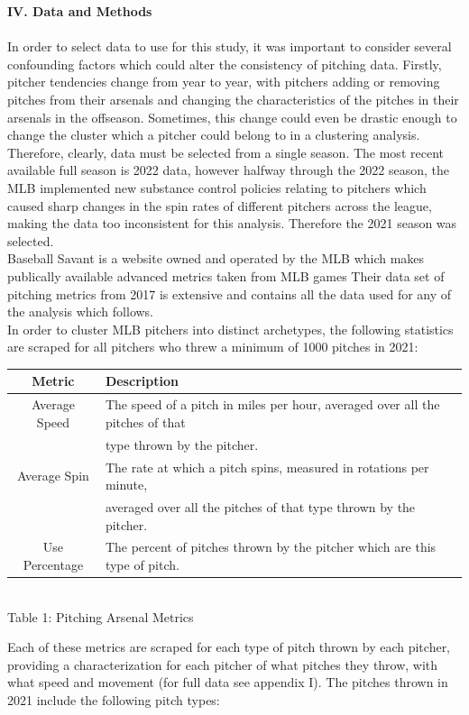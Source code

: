 \documentclass[12 pt]{article}
\begin{document}
\textbf{IV. Data and Methods} \\ \\
\indent In order to select data to use for this study, it was important to consider 
several confounding factors which could alter the consistency of pitching data. 
Firstly, pitcher tendencies change from year to year, with pitchers adding or removing 
pitches from their arsenals and changing the characteristics of the pitches in their 
arsenals in the offseason. Sometimes, this change could even be drastic enough to change the 
cluster which a pitcher could belong to in a clustering analysis. Therefore, clearly, 
data must be selected from a single season. The most recent available full season is 2022 data, however
halfway through the 2022 season, the MLB implemented new substance control policies 
relating to pitchers which caused sharp changes in the spin rates of different pitchers 
across the league, making the data too inconsistent for this analysis. Therefore the 2021 season was selected.
\\ \indent Baseball Savant is a website owned and operated by the MLB which makes 
publically available advanced metrics taken from MLB games Their data set of pitching 
metrics from 2017 is extensive and contains all the data used for any of the analysis which 
follows. 
\\ \indent In order to cluster MLB pitchers into distinct archetypes, the following 
statistics are scraped for all pitchers who threw a minimum of 1000 pitches in 2021:
\begin{center}
    \begin{tabular}{||c | l||} 
     \hline
     Metric & Description  \\ [0.5ex] 
     \hline
     Average Speed & The speed of a pitch in miles per hour, averaged over all the
     pitches of that \\ & type thrown by the pitcher. \\
     \hline
     Average Spin & The rate at which a pitch spins, measured in rotations per minute, \\
     & averaged over all the pitches of that type thrown by the pitcher. \\
     \hline
     Use Percentage & The percent of pitches thrown by the pitcher which are this type of pitch. \\
     \hline
    \end{tabular}
    \newline \\ Table 1: Pitching Arsenal Metrics
\end{center}
\indent Each of these metrics are scraped for each type of pitch thrown by each pitcher, 
providing a characterization for each pitcher of what pitches they throw, with what speed 
and movement (for full data see appendix I). The pitches thrown in 2021 include the 
following pitch types: 
\end{document}
